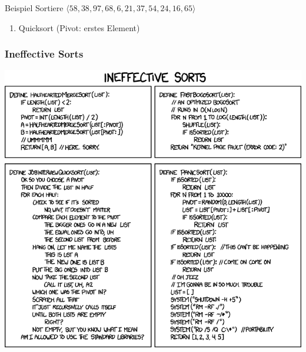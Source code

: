 \begin{frame}{Beispiel}
	Sortiere $\langle 58, 38, 97, 68, 6, 21, 37, 54, 24, 16, 65\rangle$

	\begin{enumerate}
		\item Quicksort (Pivot: erstes Element)
	\end{enumerate}
\end{frame}


\begin{frame}
	\frametitle{Ineffective Sorts}
	\begin{center}
		\includegraphics[width=\textwidth,height=\textheight,keepaspectratio]{images/ineffective_sorts}
	\end{center}
\end{frame}


